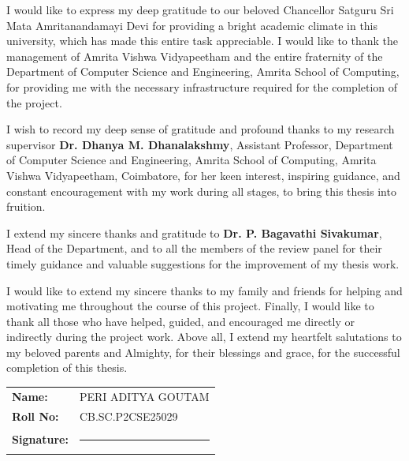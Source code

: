 \documentclass[MTech]{ugthesis}
\begin{document}
\certificate

\acknowledgements
\normalfont
I would like to express my deep gratitude to our beloved Chancellor Satguru Sri Mata Amritanandamayi Devi for providing a bright academic climate in this university, which has made this entire task appreciable. I would like to thank the management of Amrita Vishwa Vidyapeetham and the entire fraternity of the Department of Computer Science and Engineering, Amrita School of Computing, for providing me with the necessary infrastructure required for the completion of the project. 

I wish to record my deep sense of gratitude and profound thanks to my research supervisor \textbf{Dr. Dhanya M. Dhanalakshmy}, Assistant Professor, Department of Computer Science and Engineering, Amrita School of Computing, Amrita Vishwa Vidyapeetham, Coimbatore, for her keen interest, inspiring guidance, and constant encouragement with my work during all stages, to bring this thesis into fruition. 

I extend my sincere thanks and gratitude to \textbf{Dr. P. Bagavathi Sivakumar}, Head of the Department, and to all the members of the review panel for their timely guidance and valuable suggestions for the improvement of my thesis work.

I would like to extend my sincere thanks to my family and friends for helping and motivating me throughout the course of this project. Finally, I would like to thank all those who have helped, guided, and encouraged me directly or indirectly during the project work. Above all, I extend my heartfelt salutations to my beloved parents and Almighty, for their blessings and grace, for the successful completion of this thesis.

\vskip 20pt
\noindent
\begin{tabular}{@{}ll}
\textbf{Name:} & PERI ADITYA GOUTAM \\ 
\textbf{Roll No:} & CB.SC.P2CSE25029 \\
\textbf{Signature:} & \rule{5cm}{0.4pt}
\end{tabular}
\end{document}
